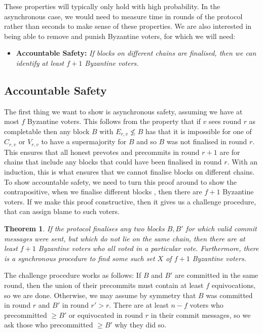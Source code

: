 \documentclass{article}
\newtheorem{theorem}{Theorem}[section]
\begin{document}
These properties will typically only hold with high probability. In the asynchronous case, we would need to measure time in rounds of the protocol rather than seconds to make sense of these properties.  We are also interested in being able to remove and punish Byzantine voters, for which we will need:

\begin{itemize}
	\item{\bf Accountable Safety:} {\em If blocks on different chains are finalised, then we can identify at least $f+1$ Byzantine voters.}
\end{itemize}



\subsection{ Accountable Safety}

The first thing we want to show is asynchronous safety, assuming we have at most $f$ Byzantine voters. This follows from the property that if $v$ sees round $r$ as completable then any block $B$ with $E_{r,v} \not\leq B$ has that it is impossible for one of $C_{r,v}$ or $V_{r,v}$ to have a supermajority for $B$ and so $B$ was not finalised in round $r$. This ensures that all honest prevotes and precommits in round $r+1$ are for chains that include any blocks that could have been finalised in round $r$. With an induction, this is what ensures that we cannot finalise blocks on different chains. To show accountable safety, we need to turn this proof around to show the contrapositive, when we finalise different blocks , then there are $f+1$ Byzantine voters. If we make this proof constructive, then it gives us a challenge procedure, that can assign blame to such voters.

\begin{theorem} \label{thm:accountable} If the protocol finalises any two blocks $B,B'$ for which valid commit messages were sent, but which do not lie on the same chain, then there are at least $f+1$ Byzantine voters who all voted in a particular vote. Furthermore, there is a synchronous procedure to find some such set $X$ of $f+1$ Byzantine voters.
\end{theorem}

The challenge procedure works as follows: If $B$ and $B'$ are committed in the same round, then the union of their precommits must contain at least $f$ equivocations, so we are done.  Otherwise, we may assume by symmetry that $B$ was committed in round $r$ and $B'$ in round $r' > r$.  There are at least $n-f$ voters who precommitted $\geq B'$ or equivocated in round $r$ in their commit messages, so we ask those who precommitted $\geq B'$ why they did so.
\end{document}
